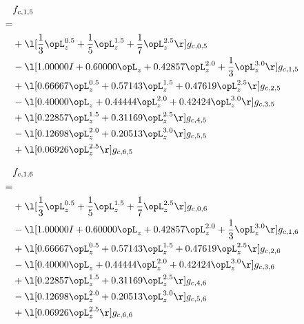 \begin{alignat}{2} 
\label{eq:f_15_0} 
& f_{c,1,5} \nonumber \\ 
 = \\ 
& + \l[ \frac{1}{3} \opL_z^{0.5} + \frac{1}{5} \opL_z^{1.5} + \frac{1}{7} \opL_z^{2.5}  \r] g_{c,0,5} \nonumber \\ 
& - \l[  1.00000 I +  0.60000 \opL_z +  0.42857 \opL_z^{2.0} + \frac{1}{3} \opL_z^{3.0}  \r] g_{c,1,5} \nonumber \\ 
& + \l[  0.66667 \opL_z^{0.5} +  0.57143 \opL_z^{1.5} +  0.47619 \opL_z^{2.5}  \r] g_{c,2,5} \nonumber \\ 
& - \l[  0.40000 \opL_z +  0.44444 \opL_z^{2.0} +  0.42424 \opL_z^{3.0}  \r] g_{c,3,5} \nonumber \\ 
& + \l[  0.22857 \opL_z^{1.5} +  0.31169 \opL_z^{2.5}  \r] g_{c,4,5} \nonumber \\ 
& - \l[  0.12698 \opL_z^{2.0} +  0.20513 \opL_z^{3.0}  \r] g_{c,5,5} \nonumber \\ 
& + \l[  0.06926 \opL_z^{2.5}  \r] g_{c,6,5} \nonumber \\ 
\end{alignat} 


\begin{alignat}{2} 
\label{eq:f_16_0} 
& f_{c,1,6} \nonumber \\ 
 = \\ 
& + \l[ \frac{1}{3} \opL_z^{0.5} + \frac{1}{5} \opL_z^{1.5} + \frac{1}{7} \opL_z^{2.5}  \r] g_{c,0,6} \nonumber \\ 
& - \l[  1.00000 I +  0.60000 \opL_z +  0.42857 \opL_z^{2.0} + \frac{1}{3} \opL_z^{3.0}  \r] g_{c,1,6} \nonumber \\ 
& + \l[  0.66667 \opL_z^{0.5} +  0.57143 \opL_z^{1.5} +  0.47619 \opL_z^{2.5}  \r] g_{c,2,6} \nonumber \\ 
& - \l[  0.40000 \opL_z +  0.44444 \opL_z^{2.0} +  0.42424 \opL_z^{3.0}  \r] g_{c,3,6} \nonumber \\ 
& + \l[  0.22857 \opL_z^{1.5} +  0.31169 \opL_z^{2.5}  \r] g_{c,4,6} \nonumber \\ 
& - \l[  0.12698 \opL_z^{2.0} +  0.20513 \opL_z^{3.0}  \r] g_{c,5,6} \nonumber \\ 
& + \l[  0.06926 \opL_z^{2.5}  \r] g_{c,6,6} \nonumber \\ 
\end{alignat} 


